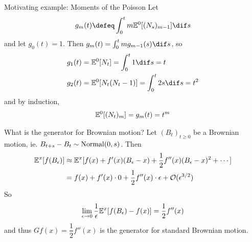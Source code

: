 \documentclass[../../../Master/AppliedStochastics.tex]{subfiles}
\begin{document}
\begin{example}{Motivating example: Moments of the Poisson}
    Let 
    $$\begin{aligned}
        g_{m}(t) \defeq \int_0^{t} m \E^{0} [(N_s)_{m-1}] \dif s
    \end{aligned}$$ 
        and let $g_0(t) = 1$. 
    Then $g_{m}(t) = \int_0^{t} m g_{m-1}(s) \dif s$,
        so
    $$\begin{aligned}
        g_1(t) &= \E^0 [N_t]          =  \int_{0}^{t}  1   \dif s = t \\
        g_2(t) &= \E^0 [N_t(N_t - 1)] =  \int_{0}^{t}  2 s \dif s = t^2 \\
    \end{aligned}$$
        and by induction,
    $$\begin{aligned}
        \mathbb{E}^0 [(N_t)_m] = g_m(t) = t^m
    \end{aligned}$$
\end{example}


\begin{example}{What is the generator for Brownian motion?}
    Let $(B_t)_{t \geq 0}$ be a Brownian motion,
        ie. $B_{t+s} - B_t \sim \operatorname{Normal}(0, s)$. 
    Then
    $$\begin{aligned}
        \mathbb{E}^x[f(B_\epsilon)]
            &\approx \mathbb{E}^x[ f(x) + f'(x) (B_\epsilon - x) +
                \frac{1}{2}f''(x) (B_\epsilon - x)^2 + \cdots] \\
            &=       f(x) + f'(x)\cdot 0 + \frac{1}{2}f''(x) \cdot \epsilon +
                \mathcal{O}(\epsilon^{3/2})
    \end{aligned}$$
    So
    $$\begin{aligned}
        \lim_{\epsilon \to 0} \dfrac{1}{\epsilon}
            \mathbb{E}^{x}[ f(B_\epsilon) - f(x) ] = \dfrac{1}{2} f''(x)
    \end{aligned}$$
        and thus $Gf(x) = \dfrac{1}{2} f''(x)$ is the generator
        for standard Brownian motion.
\end{example}
\end{document}
